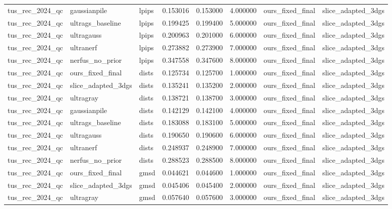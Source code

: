 \begin{tabular}{llllllll}
tus\_rec\_2024\_qc & gaussianpile & lpips & 0.153016 & 0.153000 & 4.000000 & ours\_fixed\_final & slice\_adapted\_3dgs \\
tus\_rec\_2024\_qc & ultrags\_baseline & lpips & 0.199425 & 0.199400 & 5.000000 & ours\_fixed\_final & slice\_adapted\_3dgs \\
tus\_rec\_2024\_qc & ultragauss & lpips & 0.200963 & 0.201000 & 6.000000 & ours\_fixed\_final & slice\_adapted\_3dgs \\
tus\_rec\_2024\_qc & ultranerf & lpips & 0.273882 & 0.273900 & 7.000000 & ours\_fixed\_final & slice\_adapted\_3dgs \\
tus\_rec\_2024\_qc & nerfus\_no\_prior & lpips & 0.347558 & 0.347600 & 8.000000 & ours\_fixed\_final & slice\_adapted\_3dgs \\
tus\_rec\_2024\_qc & ours\_fixed\_final & dists & 0.125734 & 0.125700 & 1.000000 & ours\_fixed\_final & slice\_adapted\_3dgs \\
tus\_rec\_2024\_qc & slice\_adapted\_3dgs & dists & 0.135241 & 0.135200 & 2.000000 & ours\_fixed\_final & slice\_adapted\_3dgs \\
tus\_rec\_2024\_qc & ultragray & dists & 0.138721 & 0.138700 & 3.000000 & ours\_fixed\_final & slice\_adapted\_3dgs \\
tus\_rec\_2024\_qc & gaussianpile & dists & 0.142129 & 0.142100 & 4.000000 & ours\_fixed\_final & slice\_adapted\_3dgs \\
tus\_rec\_2024\_qc & ultrags\_baseline & dists & 0.183088 & 0.183100 & 5.000000 & ours\_fixed\_final & slice\_adapted\_3dgs \\
tus\_rec\_2024\_qc & ultragauss & dists & 0.190650 & 0.190600 & 6.000000 & ours\_fixed\_final & slice\_adapted\_3dgs \\
tus\_rec\_2024\_qc & ultranerf & dists & 0.248937 & 0.248900 & 7.000000 & ours\_fixed\_final & slice\_adapted\_3dgs \\
tus\_rec\_2024\_qc & nerfus\_no\_prior & dists & 0.288523 & 0.288500 & 8.000000 & ours\_fixed\_final & slice\_adapted\_3dgs \\
tus\_rec\_2024\_qc & ours\_fixed\_final & gmsd & 0.044621 & 0.044600 & 1.000000 & ours\_fixed\_final & slice\_adapted\_3dgs \\
tus\_rec\_2024\_qc & slice\_adapted\_3dgs & gmsd & 0.045406 & 0.045400 & 2.000000 & ours\_fixed\_final & slice\_adapted\_3dgs \\
tus\_rec\_2024\_qc & ultragray & gmsd & 0.057640 & 0.057600 & 3.000000 & ours\_fixed\_final & slice\_adapted\_3dgs \\

\end{tabular}
